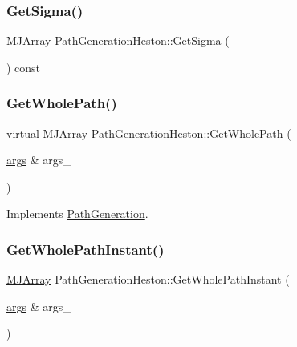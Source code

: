 \hypertarget{classPathGenerationHeston_a965b1c92fc29da4d74ee457cd9d56cb1}{}\label{classPathGenerationHeston_a965b1c92fc29da4d74ee457cd9d56cb1} 
\subsubsection{\texorpdfstring{Get\+Sigma()}{GetSigma()}}
{\footnotesize\ttfamily \hyperlink{classMJArray}{M\+J\+Array} Path\+Generation\+Heston\+::\+Get\+Sigma (\begin{DoxyParamCaption}{ }\end{DoxyParamCaption}) const\hspace{0.3cm}{\ttfamily [inline]}}

\hypertarget{classPathGenerationHeston_a2916170a243c003fb8362c13def63483}{}\label{classPathGenerationHeston_a2916170a243c003fb8362c13def63483} 
\subsubsection{\texorpdfstring{Get\+Whole\+Path()}{GetWholePath()}}
{\footnotesize\ttfamily virtual \hyperlink{classMJArray}{M\+J\+Array} Path\+Generation\+Heston\+::\+Get\+Whole\+Path (\begin{DoxyParamCaption}\item[{\hyperlink{path__generation_8h_a75c13cde2074f502cc4348c70528572d}{args} \&}]{args\+\_\+ }\end{DoxyParamCaption})\hspace{0.3cm}{\ttfamily [virtual]}}



Implements \hyperlink{classPathGeneration_ace7520fed7b6a7711f4d3684c974cb76}{Path\+Generation}.

\hypertarget{classPathGenerationHeston_aa195e4a13dc9d18165e4cf8a5e809e02}{}\label{classPathGenerationHeston_aa195e4a13dc9d18165e4cf8a5e809e02} 
\subsubsection{\texorpdfstring{Get\+Whole\+Path\+Instant()}{GetWholePathInstant()}}
{\footnotesize\ttfamily \hyperlink{classMJArray}{M\+J\+Array} Path\+Generation\+Heston\+::\+Get\+Whole\+Path\+Instant (\begin{DoxyParamCaption}\item[{\hyperlink{path__generation_8h_a75c13cde2074f502cc4348c70528572d}{args} \&}]{args\+\_\+ }\end{DoxyParamCaption})}


